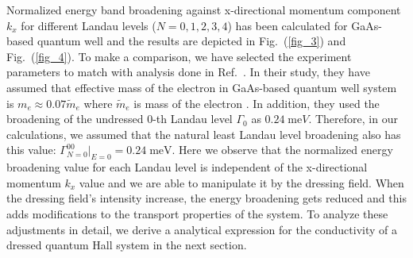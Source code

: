 Normalized energy band broadening against x-directional momentum component ${k_x}$ for different Landau levels ($N = 0,1,2,3,4$) has been calculated for GaAs-based quantum well and the results are depicted in Fig.~(\ref{fig_3}) and Fig.~(\ref{fig_4}). To make a comparison, we have selected the experiment parameters to match with analysis done in Ref.~\cite{endo09}.
In their study, they have assumed that effective mass of the electron in GaAs-based quantum well system is $m_e \approx 0.07\tilde{m}_e$ where $\tilde{m}_e$ is mass of the electron \cite{endo09,winkler03,wackerl20}. In addition, they used the broadening of the undressed $0$-th Landau level $\Gamma_0$ as $0.24\;\text{me}V$. Therefore, in our calculations, we assumed that the natural least Landau level broadening also has this value: $\Gamma^{00}_{N=0}|_{E=0} = 0.24 \;\text{meV}$.
Here we observe that the normalized energy broadening value for each Landau level is independent of the x-directional momentum $k_x$ value and we are able to manipulate it by the dressing field. When the dressing field's intensity increase, the energy broadening gets reduced and this adds modifications to the transport properties of the system.
To analyze these adjustments in detail, we derive a analytical expression for the conductivity of a dressed quantum Hall system in the next section.
